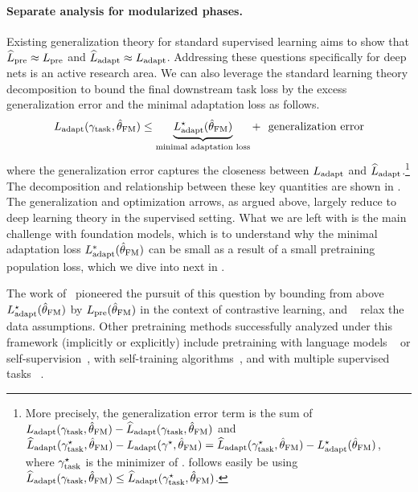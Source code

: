 \paragraph{Separate analysis for modularized phases.} Existing generalization theory for standard supervised learning aims to show that $\widehat{L}_{\text{pre}}\approx L_{\text{pre}}$ and $\widehat{L}_{\text{adapt}}\approx L_{\text{adapt}}$. 
Addressing these questions specifically for deep nets is an active research area. 
We can also leverage the standard learning theory decomposition to bound the final downstream task loss by the excess generalization error and the minimal adaptation loss as follows. 
 \begin{align}
    L_{\text{adapt}}(\gamma_{\text{task}}, \hat{\theta}_{\textup{FM}}) \le \underbrace{L_{\text{adapt}}^\star(\hat{\theta}_{\textup{FM}})}_{\textup{minimal adaptation loss}} + \textup{~~generalization error}
    \label{eqn:6}
\end{align}
where the generalization error captures the closeness between $L_{\text{adapt}}$ and $\widehat{L}_{\text{adapt}}$.\footnote{More precisely, the generalization error term is the sum of  $L_{\text{adapt}}(\gamma_{\text{task}}, \hat{\theta}_{\textup{FM}}) -  \widehat{L}_{\text{adapt}}(\gamma_{\text{task}}, \hat{\theta}_{\textup{FM}})$ and $\widehat{L}_{\text{adapt}}(\gamma_{\text{task}}^\star, \hat{\theta}_{\textup{FM}})-L_{\text{adapt}}(\gamma^\star, \hat{\theta}_{\textup{FM}}) = \widehat{L}_{\text{adapt}}(\gamma_{\text{task}}^\star, \hat{\theta}_{\textup{FM}})-L_{\text{adapt}}^\star(\hat{\theta}_{\textup{FM}})$, where $\gamma_{\text{task}}^\star$ is the minimizer of .  follows easily be using $\widehat{L}_{\text{adapt}}(\gamma_{\text{task}}, \hat{\theta}_{\textup{FM}})\le \widehat{L}_{\text{adapt}}(\gamma_{\text{task}}^\star, \hat{\theta}_{\textup{FM}})$.}
The decomposition and relationship between these key quantities are shown in . 
The generalization and optimization arrows, as argued above, largely reduce to deep learning theory in the supervised setting. 
What we are left with is the main challenge with foundation models, which is to understand why the minimal adaptation loss $L_{\text{adapt}}^*(\hat{\theta}_{\textup{FM}})$ can be small as a result of a small pretraining population loss, which we dive into next in .

The work of~\citet{arora2019theoretical} pioneered the pursuit of this question by bounding from above $L_{\text{adapt}}^\star(\hat{\theta}_{\textup{FM}})$ by $L_{\text{pre}}(\hat{\theta}_{\textup{FM}})$ in the context of contrastive learning, and ~\citet{haochen2021spectral,tosh2020contrastive,tosh2021contrastive} relax the data assumptions. Other pretraining methods successfully analyzed under this framework (implicitly or explicitly) include pretraining with language models ~\cite{wei2021pretrained} or self-supervision~\cite{lee2020predicting}, with self-training algorithms~\cite{wei2020theoretical,cai2021theory}, and with multiple supervised tasks ~\cite{tripuraneni2020theory,du2020fewshot}. 

